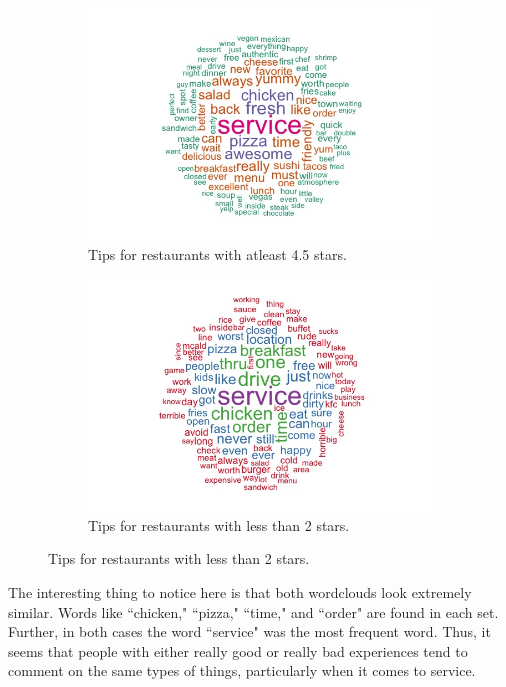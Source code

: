 \documentclass[11pt]{article}
\begin{document}
\begin{figure}[h]
\caption{Wordclouds of tips for great restaurants and terrible restaurants.\label{fig:wordcloud}}
\centering
\begin{subfigure}{0.49\linewidth}
\includegraphics[width=\linewidth]{Figures/wordcloud_top.jpeg}
\caption{\footnotesize{Tips for restaurants with atleast 4.5 stars.}}
\label{fig:wordcloud_a}
\end{subfigure}
\begin{subfigure}{0.49\linewidth}
\includegraphics[width=\linewidth]{Figures/wordcloud_bottom.jpeg}
\caption{\footnotesize{Tips for restaurants with less than 2 stars.}}
\label{fig:wordcloud_b}
\end{subfigure}
\end{figure}

The interesting thing to notice here is that both wordclouds look extremely similar. Words like ``chicken," ``pizza," ``time," and ``order" are found in each set. Further, in both cases the word ``service" was the most frequent word. Thus, it seems that people with either really good or really bad experiences tend to comment on the same types of things, particularly when it comes to service.
\end{document}
